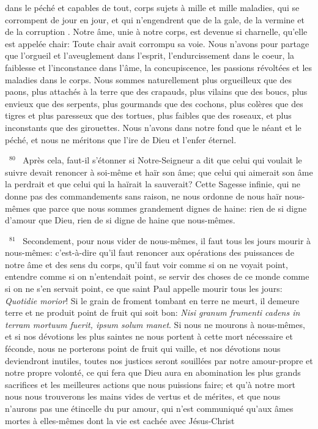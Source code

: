 \documentclass[paper=a5,pagesize=pdftex,fontsize=15pt,headinclude=on,twoside=off]{scrbook}
\newcommand{\negphantom}[1]{\settowidth{\dimen0}{#1}\hspace*{-\dimen0}}
\newcommand{\versenb}[1]{\par \vspace{10pt}~\negphantom{~${}^{#1}$~}${}^{#1}$~}
\newcommand{\latin}[1]{\emph{#1}}
\begin{document}
dans le péché et capables de tout, corps sujets à mille et mille maladies, qui se corrompent de jour en jour, et qui
n'engendrent que de la gale, de la vermine et de la corruption .
Notre âme, unie à notre corps, est devenue si charnelle, qu'elle est appelée chair: Toute chair avait corrompu sa
voie. Nous n'avons pour partage que l'orgueil et l'aveuglement dans l'esprit, l'endurcissement dans le coeur, la
faiblesse et l'inconstance dans l'âme, la concupiscence, les passions révoltées et les maladies dans le corps. Nous
sommes naturellement plus orgueilleux que des paons, plus attachés à la terre que des crapauds, plus vilains que
des boucs, plus envieux que des serpents, plus gourmands que des cochons, plus colères que des tigres et plus
paresseux que des tortues, plus faibles que des roseaux, et plus inconstants que des girouettes. Nous n'avons
dans notre fond que le néant et le péché, et nous ne méritons que l'ire de Dieu et l'enfer éternel.
\versenb{80} Après cela, faut-il s'étonner si Notre-Seigneur a dit que celui qui voulait le suivre devait renoncer à soi-même
et haïr son âme; que celui qui aimerait son âme la perdrait et que celui qui la haïrait la sauverait? Cette Sagesse
infinie, qui ne donne pas des commandements sans raison, ne nous ordonne de nous haïr nous-mêmes que parce
que nous sommes grandement dignes de haine: rien de si digne d'amour que Dieu, rien de si digne de haine que
nous-mêmes.
\versenb{81} Secondement, pour nous vider de nous-mêmes, il faut tous les jours mourir à nous-mêmes: c'est-à-dire qu'il
faut renoncer aux opérations des puissances de notre âme et des sens du corps, qu'il faut voir comme si on ne
voyait point, entendre comme si on n'entendait point, se servir des choses de ce monde comme si on ne s'en
servait point, ce que saint Paul appelle mourir tous les jours: \latin{Quotidie morior}! Si le grain de froment tombant en
terre ne meurt, il demeure terre et ne produit point de fruit qui soit bon: \latin{Nisi granum frumenti cadens in terram
mortuum fuerit, ipsum solum manet}. Si nous ne mourons à nous-mêmes, et si nos dévotions les plus saintes ne
nous portent à cette mort nécessaire et féconde, nous ne porterons point de fruit qui vaille, et nos dévotions nous
deviendront inutiles, toutes nos justices seront souillées par notre amour-propre et notre propre volonté, ce qui fera
que Dieu aura en abomination les plus grands sacrifices et les meilleures actions que nous puissions faire; et qu'à
notre mort nous nous trouverons les mains vides de vertus et de mérites, et que nous n'aurons pas une étincelle
du pur amour, qui n'est communiqué qu'aux âmes mortes à elles-mêmes dont la vie est cachée avec Jésus-Christ
\end{document}
